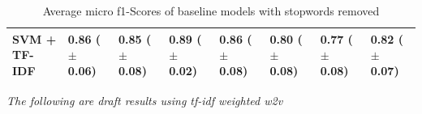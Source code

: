 \documentclass[a4paper,twoside,phd]{BYUPhys}
\begin{document}
\begin{table}[H]
\begin{tabular}{|p{1.7cm}|p{1.6cm}|p{1.6cm}|p{1.6cm}|p{1.6cm}|p{1.6cm}|p{1.6cm}|p{1.6cm}|}
		SVM + TF-IDF  &  0.86 \newline ($\pm$ 0.06)  & 0.85 \newline ($\pm$ 0.08)  & 0.89 \newline ($\pm$ 0.02)  &  0.86 \newline ($\pm$ 0.08)  &  0.80 \newline ($\pm$ 0.08)   & 0.77 \newline ($\pm$ 0.08)   & 0.82 \newline ($\pm$ 0.07)  \\
		\hline                                                                                                                                                                                                                                                                                                                             
	\end{tabular}
	\caption{Average micro f1-Scores of baseline models with stopwords removed}
	\label{table:BaselineAccuracy}
\end{table}

\textit{The following are draft results using tf-idf weighted w2v}
\end{document}
